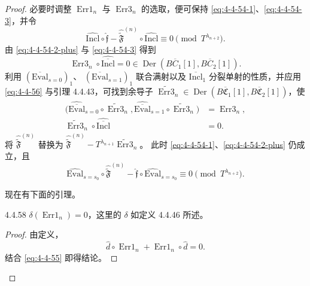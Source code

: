 \begin{proof}
必要时调整 $\operatorname{Err1}_n$ 与
$\operatorname{Err3}_n$ 的选取，便可保持
\eqref{eq:4-4-54-1}、\eqref{eq:4-4-54-3}，并令
\begin{equation}
 \widehat{\mathrm{Incl}}\circ\widehat{\mathfrak f}
 -\widehat{\widetilde{\mathfrak F}}^{(n)}
 \circ\widehat{\mathrm{Incl}}
 \equiv0\pmod{T^{\lambda_{n+2}}}.
\tag{4.4.54.2+}\label{eq:4-4-54-2-plus}
\end{equation}
由 \eqref{eq:4-4-54-2-plus} 与 \eqref{eq:4-4-54-3} 得到
\begin{equation}
 \operatorname{Err3}_n
 \circ\widehat{\overline{\mathrm{Incl}}}=0
 \in\operatorname{Der}(B\overline C_1[1],B\overline C_2[1]).
\tag{4.4.56}\label{eq:4-4-56}
\end{equation}
利用 $(\overline{\mathrm{Eval}}_{s=0})_1$、
$(\overline{\mathrm{Eval}}_{s=1})_1$ 联合满射以及
$\overline{\mathrm{Incl}}_1$ 分裂单射的性质，并应用
\eqref{eq:4-4-56} 与引理 4.4.43，可找到余导子
$\widetilde{\operatorname{Err3}}_n\in
\operatorname{Der}(B\overline{\mathfrak C}_1[1],
B\overline{\mathfrak C}_2[1])$，使
\begin{align}
 \bigl(\widehat{\overline{\mathrm{Eval}}}_{s=0}
 \circ\widetilde{\operatorname{Err3}}_n,
 \widehat{\overline{\mathrm{Eval}}}_{s=1}
 \circ\widetilde{\operatorname{Err3}}_n\bigr)
 &=\operatorname{Err3}_n,
 \tag{4.4.57.1}\label{eq:4-4-57-1}\\
 \widetilde{\operatorname{Err3}}_n
 \circ\widehat{\overline{\mathrm{Incl}}}&=0.
 \tag{4.4.57.2}\label{eq:4-4-57-2}
\end{align}
将 $\widehat{\widetilde{\mathfrak F}}^{(n)}$ 替换为
$\widehat{\widetilde{\mathfrak F}}^{(n)}
-T^{\lambda_{n+1}}\widetilde{\operatorname{Err3}}_n$。
此时 \eqref{eq:4-4-54-1}、\eqref{eq:4-4-54-2-plus} 仍成立，且
\begin{equation}
 \widehat{\mathrm{Eval}}_{s=s_0}
 \circ\widehat{\widetilde{\mathfrak F}}^{(n)}
 -\widehat{\mathfrak f}\circ
 \widehat{\mathrm{Eval}}_{s=s_0}
 \equiv0\pmod{T^{\lambda_{n+2}}}.
\tag{4.4.54.3+}\label{eq:4-4-54-3-plus}
\end{equation}

现在有下面的引理。

\begin{lemma}{4.4.58}\label{lem:4-4-58}
$\delta(\operatorname{Err1}_n)=0$，这里的 $\delta$ 如定义
4.4.46 所述。
\end{lemma}

\begin{proof}
由定义，
\[
 \widehat d\circ\operatorname{Err1}_n
 +\operatorname{Err1}_n\circ\widehat d=0.
\]
结合 \eqref{eq:4-4-55} 即得结论。
\end{proof}


\end{proof}
